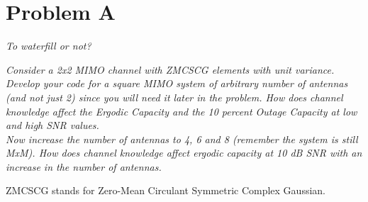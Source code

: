 \section{Problem A}
\textit{To waterfill or not?}

\textit{Consider a 2x2 MIMO channel with ZMCSCG elements with unit variance. Develop your code for a square MIMO system of arbitrary number of antennas (and not just 2) since you will need it later in the problem. How does channel knowledge affect the Ergodic Capacity and the 10 percent Outage Capacity at low and high SNR values.} \\

\textit{Now increase the number of antennas to 4, 6 and 8 (remember the system is still MxM). How does channel knowledge affect ergodic capacity at 10 dB SNR with an increase in the number of antennas.}

ZMCSCG stands for Zero-Mean Circulant Symmetric Complex Gaussian.
